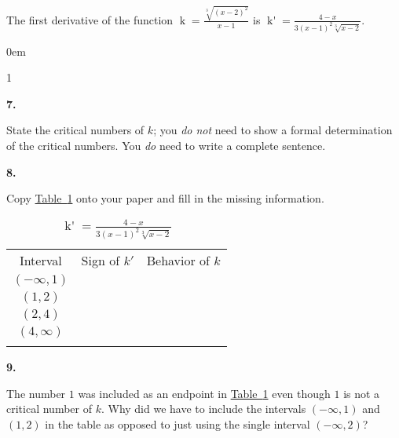 \documentclass[12pt,]{book}
\theoremstyle{plain}
\theoremstyle{definition}
\numberwithin{equation}{section}
\newcommand{\hrulethin}  {\noalign{\hrule height 0.04em}}
\newcommand{\hrulemedium}{\noalign{\hrule height 0.07em}}
\newcommand{\hrulethick} {\noalign{\hrule height 0.11em}}
\newenvironment{exercisegroup}%
{\medskip\noindent}%
{\par\bigskip}%
\newlength{\exercisegroupindent}%
\newlength{\exercisegroupitemwidth}%
\newenvironment{exercisegrouplist}%
{\vspace{-\partopsep}%
\begin{adjustwidth}{\exercisegroupindent}{0em}}%
{\end{adjustwidth}%
\vspace{-\partopsep}%
\vspace{\baselineskip}}%
\newenvironment{exercisegroupbycol}[1]%
{\begin{exercisegrouplist}%
\vspace{-\multicolsep}%
\begin{multicols}{#1}%
\setlength{\parindent}{0em}%
\setlength{\exercisegroupitemwidth}{\linewidth}}%
{\end{multicols}%
\vspace{-\multicolsep}%
\end{exercisegrouplist}}%
\newenvironment{exercisegroupitem}[1]%
{\begin{minipage}[t]{\exercisegroupitemwidth}
\vspace{0pt}%
{\bfseries#1}%
\rule{0pt}{\baselineskip}}{\strut%
\end{minipage}%
\hspace{\columnsep}}%
\providecommand\phantomsection{}
\newcommand{\fe}[2]{\mathop{{#1}{\left(#2\right)}}}
\newcommand{\ointerval}[2]{\left(#1,#2\right)}
\newcommand{\fd}[1]{#1'}
\begin{document}
\begin{exercisegroup}%
The first derivative of the function \(\fe{k}{x}=\frac{\sqrt[3]{(x-2)^2}}{x-1}\) is \(\fe{\fd{k}}{t}=\frac{4-x}{3(x-1)^2\sqrt[3]{x-2}}\).%
\par
\begin{exercisegroupbycol}{1}%
\begin{exercisegroupitem}{7. }\phantomsection\hypertarget{exercise-418}{\null}
State the critical numbers of \(k\); you \emph{do not} need to show a formal determination of the critical numbers.  You \emph{do} need to write a complete sentence.%
\end{exercisegroupitem}%
\par%
\begin{exercisegroupitem}{8. }\phantomsection\hypertarget{exercise-419}{\null}
Copy \hyperref[table-trient-rational-sign-table]{Table~\ref*{table-trient-rational-sign-table}} onto your paper and fill in the missing information.%
\begin{table}
\centering
\caption{\(\fe{\fd{k}}{t}=\frac{4-x}{3(x-1)^2\sqrt[3]{x-2}}\)\label{table-trient-rational-sign-table}}
\begin{tabular}{ccc}\hrulethick
Interval&Sign of \(\fd{k}\)&Behavior of \(k\)\\\hrulemedium
\(\ointerval{-\infty}{1}\)&&\\\hrulethin
\(\ointerval{1}{2}\)&&\\\hrulethin
\(\ointerval{2}{4}\)&&\\\hrulethin
\(\ointerval{4}{\infty}\)&&\\\hrulethick
\end{tabular}
\end{table}
\end{exercisegroupitem}%
\par%
\begin{exercisegroupitem}{9. }\phantomsection\hypertarget{exercise-420}{\null}
The number \(1\) was included as an endpoint in \hyperref[table-trient-rational-sign-table]{Table~\ref*{table-trient-rational-sign-table}} even though \(1\) is not a critical number of \(k\).  Why did we have to include the intervals \(\ointerval{-\infty}{1}\) and \(\ointerval{1}{2}\) in the table as opposed to just using the single interval \(\ointerval{-\infty}{2}\)?%
\end{exercisegroupitem}%
\par%
\end{exercisegroupbycol}%
\end{exercisegroup}%
\end{document}
